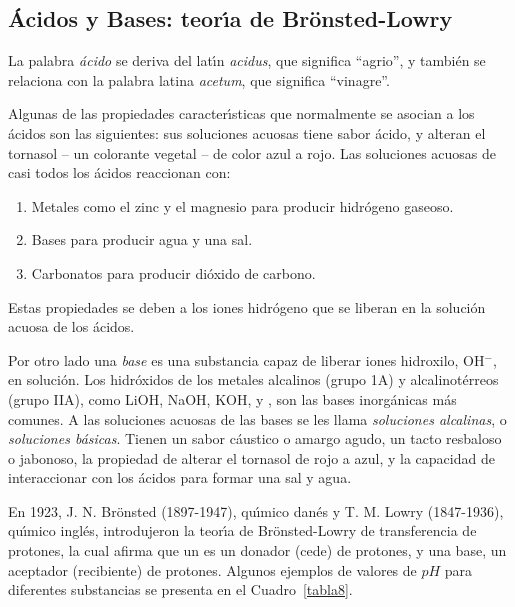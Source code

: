 \subsection{\'Acidos y Bases: teor\'{\i}a de Br\"onsted-Lowry}
La palabra
\textit{\'acido} se deriva del lat\'{\i}n
\textit{acidus}, que significa ``agrio'', y tambi\'en se
relaciona con la palabra latina \textit{acetum}, que 
significa ``vinagre''.

Algunas de las propiedades caracter\'{\i}sticas que normalmente se asocian a los \'acidos son las siguientes:
sus soluciones acuosas tiene sabor \'acido, y alteran el  tornasol -- un colorante vegetal -- de color azul a rojo. Las soluciones acuosas de casi todos los \'acidos reaccionan con:
\begin{enumerate}
\item Metales como el zinc y el magnesio para producir hidr\'ogeno
gaseoso.
\item Bases para producir agua y una sal.
\item Carbonatos para producir di\'oxido de carbono.
\end{enumerate}
Estas propiedades se deben a los iones hidr\'ogeno que se liberan  en la soluci\'on acuosa de los \'acidos.

Por otro lado una \textit{base} es una substancia capaz de liberar iones hidroxilo, OH$^-$, en soluci\'on. Los hidr\'oxidos de los metales alcalinos (grupo 1A) y alcalinot\'erreos (grupo IIA), como LiOH, NaOH, KOH,  y , son las bases inorg\'anicas m\'as comunes. A las soluciones acuosas de las bases se les llama \textit{soluciones alcalinas}, o \textit{soluciones b\'asicas}. Tienen un sabor c\'austico o amargo agudo, un tacto resbaloso o jabonoso, la propiedad de alterar el tornasol de rojo a azul, y la capacidad de interaccionar con los \'acidos para formar una sal y agua.

En 1923, J. N. Br\"onsted (1897-1947), qu\'{\i}mico dan\'es y T. M. Lowry (1847-1936), qu\'{\i}mico ingl\'es, introdujeron la teor\'{\i}a de  Br\"onsted-Lowry de transferencia de protones, la cual afirma que un    es un donador (cede) de protones, y una base, un aceptador (recibiente) de protones. Algunos ejemplos de valores de $pH$ para diferentes substancias se presenta en el Cuadro~\ref{tabla8}.

